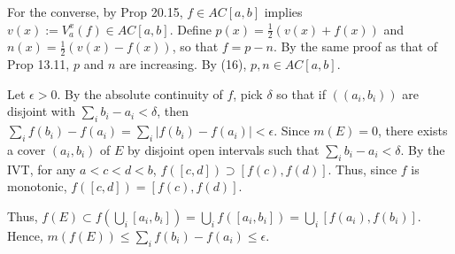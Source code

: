 \documentclass{article}
\begin{document}
For the converse, by Prop 20.15, $f \in AC[a,b]$ implies $v(x) := V_a^x(f) \in AC[a,b]$. Define $p(x) = \frac 1 2 (v(x) + f(x))$ and $n(x) = \frac 1 2 (v(x) - f(x))$, so that $f = p - n$.   By the same proof as that of Prop 13.11, $p$ and $n$ are increasing. By (16), $p,n \in AC[a,b]$. 

 Let $\epsilon > 0$.  By the absolute continuity of $f$, pick $\delta$ so that if $((a_i,b_i))$ are disjoint with $\sum_i b_i - a_i < \delta$, then
$\sum_i f(b_i) - f(a_i) = \sum_i |f(b_i) - f(a_i)| < \epsilon$.  Since $m(E) = 0$, there exists a cover $(a_i,b_i)$ of $E$ by disjoint open intervals such that $\sum_i b_i - a_i < \delta$.  By the IVT, for any $a<c<d<b$, $f([c,d]) \supset [f(c), f(d)]$. Thus, since $f$ is monotonic, $f([c,d]) = [f(c),f(d)]$.

Thus, $f(E) \subset f(\bigcup_i [a_i,b_i]) = \bigcup_i f([a_i, b_i]) = \bigcup_i [f(a_i), f(b_i)]$. Hence, $m(f(E)) \le \sum_i f(b_i) - f(a_i) \le \epsilon$.
\end{document}
